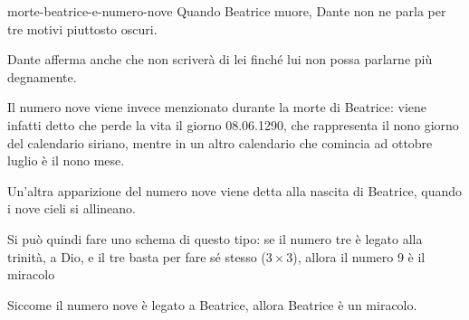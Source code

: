 \documentclass[preview]{standalone}
\begin{document}
\begin{snippet}{morte-beatrice-e-numero-nove}
    Quando Beatrice muore, Dante non ne parla per tre motivi piuttosto oscuri. 
    
    Dante afferma anche che non scriverà di lei finché lui non possa parlarne più degnamente.

    \vspace{0.25cm}

    Il numero nove viene invece menzionato durante la morte di Beatrice: viene infatti detto che
    perde la vita il giorno 08.06.1290, che rappresenta il nono giorno del calendario siriano, mentre
    in un altro calendario che comincia ad ottobre luglio è il nono mese.

    \vspace{0.25cm}

    Un'altra apparizione del numero nove viene detta alla nascita di Beatrice, quando i nove cieli si allineano.

    \vspace{0.25cm}

    Si può quindi fare uno schema di questo tipo: se il numero tre è legato alla trinità, a Dio,
    e il tre basta per fare sé stesso (\(3 \times 3\)), allora il numero 9 è il miracolo

    \vspace{0.25cm}

    \begin{center}
    \end{center}

    \vspace{0.25cm}

    Siccome il numero nove è legato a Beatrice, allora Beatrice è un miracolo.

\end{snippet}
\end{document}
